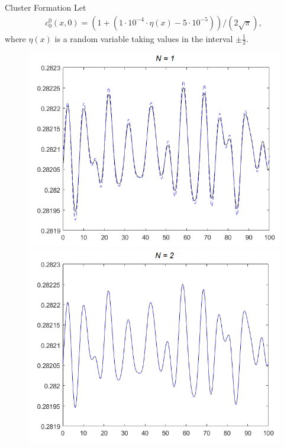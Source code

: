 \begin{frame}{Cluster Formation}
	\scriptsize
	Let 
	\begin{align*}
		c^0_0 (x,0) = (1+(1\cdot10^{-4} \cdot \eta(x)-5\cdot10^{-5}))/(2\sqrt{\pi}),
	\end{align*}
where $\eta(x)$ is a random variable taking values in the interval $\pm \frac{1}{2}$.
	
	\begin{figure}
		\centering
		\begin{minipage}{0.46\textwidth}
			\includegraphics[width=\textwidth]{Bilder_wx/ClusterFormation/N=1vsN=6_Dr=0.05_mx=8192}
		\end{minipage}
		\hfill
		\begin{minipage}{0.46\textwidth}
			\includegraphics[width=\textwidth]{Bilder_wx/ClusterFormation/N=2vsN=6_Dr=0.05_mx=8192}

\end{minipage}
\end{figure}
\end{frame}
